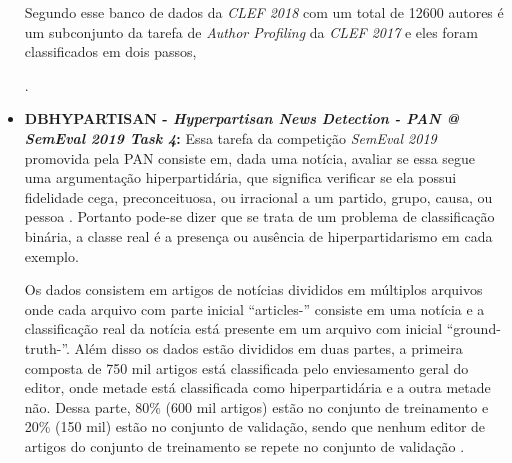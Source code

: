 \begin{itemize}
        Segundo  esse banco de dados da \textit{CLEF 2018} com um total de 12600 autores é um subconjunto da tarefa de \textit{Author Profiling} da \textit{CLEF 2017} e eles foram classificados em dois passos,
        \cite{rangel2017overview}.
        
        
        \item \textbf{DB\underscore{}HYPARTISAN - \textit{Hyperpartisan News Detection - PAN @ SemEval 2019 Task 4}:} Essa tarefa da competição \textit{SemEval 2019} promovida pela PAN consiste em, dada uma notícia, avaliar se essa segue uma argumentação hiperpartidária, que significa verificar se ela possui fidelidade cega, preconceituosa, ou irracional a um partido, grupo, causa, ou pessoa \cite{PAN_HND_2019}.
        Portanto pode-se dizer que se trata de um problema de classificação binária, a classe real é a presença ou ausência de hiperpartidarismo em cada exemplo.
        
        Os dados consistem em artigos de notícias divididos em múltiplos arquivos onde cada arquivo com parte inicial ``articles-'' consiste em uma notícia e a classificação real da notícia está presente em um arquivo com inicial ``ground-truth-''. 
        Além disso os dados estão divididos em duas partes, a primeira composta de 750 mil artigos está classificada pelo enviesamento geral do editor, onde metade está classificada como hiperpartidária e a outra metade não. 
        Dessa parte, 80\% (600 mil artigos) estão no conjunto de treinamento e 20\% (150 mil) estão no conjunto de validação, sendo que nenhum editor de artigos do conjunto de treinamento se repete no conjunto de validação \cite{johannes_kiesel_2018_1489920}.
        

\end{itemize}
